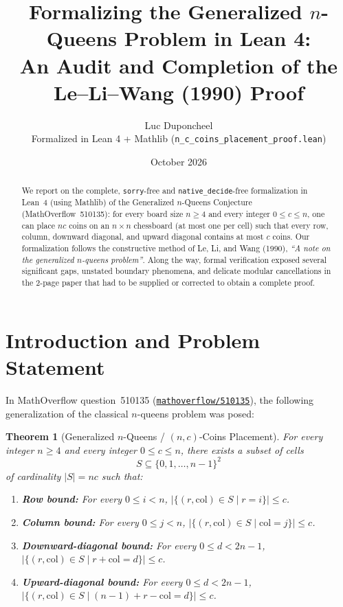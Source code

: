 \documentclass[11pt,a4paper]{article}
\title{\textbf{Formalizing the Generalized $n$-Queens Problem in Lean 4:\\
An Audit and Completion of the Le--Li--Wang (1990) Proof}}
\author{Luc Duponcheel \\ \small Formalized in Lean 4 + Mathlib (\texttt{n\_c\_coins\_placement\_proof.lean})}
\date{October 2026}
\newtheorem{theorem}{Theorem}[section]
\theoremstyle{remark}
\begin{document}
\maketitle

\begin{abstract}
We report on the complete, \texttt{sorry}-free and \texttt{native\_decide}-free formalization in Lean~4 (using Mathlib) of the Generalized $n$-Queens Conjecture (MathOverflow~510135): for every board size $n \ge 4$ and every integer $0 \le c \le n$, one can place $nc$ coins on an $n \times n$ chessboard (at most one per cell) such that every row, column, downward diagonal, and upward diagonal contains at most $c$ coins. Our formalization follows the constructive method of Le, Li, and Wang (1990), \emph{``A note on the generalized $n$-queens problem''}. Along the way, formal verification exposed several significant gaps, unstated boundary phenomena, and delicate modular cancellations in the 2-page paper that had to be supplied or corrected to obtain a complete proof.
\end{abstract}

\tableofcontents

\section{Introduction and Problem Statement}

In MathOverflow question~510135 (\href{https://mathoverflow.net/questions/510135}{\texttt{mathoverflow/510135}}), the following generalization of the classical $n$-queens problem was posed:

\begin{theorem}[Generalized $n$-Queens / $(n,c)$-Coins Placement]
\label{thm:main}
For every integer $n \ge 4$ and every integer $0 \le c \le n$, there exists a subset of cells
\[
  S \subseteq \{0, 1, \dots, n-1\}^2
\]
of cardinality $|S| = nc$ such that:
\begin{enumerate}[nosep,label=(\roman*)]
  \item \textbf{Row bound:} For every $0 \le i < n$, $|\{(r, \mathrm{col}) \in S \mid r = i\}| \le c$.
  \item \textbf{Column bound:} For every $0 \le j < n$, $|\{(r, \mathrm{col}) \in S \mid \mathrm{col} = j\}| \le c$.
  \item \textbf{Downward-diagonal bound:} For every $0 \le d < 2n - 1$, $|\{(r, \mathrm{col}) \in S \mid r + \mathrm{col} = d\}| \le c$.
  \item \textbf{Upward-diagonal bound:} For every $0 \le d < 2n - 1$, $|\{(r, \mathrm{col}) \in S \mid (n - 1) + r - \mathrm{col} = d\}| \le c$.
\end{enumerate}
\end{theorem}
\end{document}
